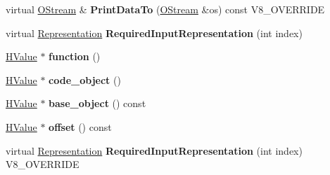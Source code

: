 \begin{DoxyCompactItemize}
\item 
\hypertarget{classv8_1_1internal_1_1_v8___f_i_n_a_l_ac450dad970b14246be761ccf5004924b}{}virtual \hyperlink{classv8_1_1internal_1_1_o_stream}{O\+Stream} \& {\bfseries Print\+Data\+To} (\hyperlink{classv8_1_1internal_1_1_o_stream}{O\+Stream} \&os) const V8\+\_\+\+O\+V\+E\+R\+R\+I\+D\+E\label{classv8_1_1internal_1_1_v8___f_i_n_a_l_ac450dad970b14246be761ccf5004924b}

\item 
\hypertarget{classv8_1_1internal_1_1_v8___f_i_n_a_l_a9c3e2a944e903467b6f0c68ec0ad8827}{}virtual \hyperlink{classv8_1_1internal_1_1_representation}{Representation} {\bfseries Required\+Input\+Representation} (int index)\label{classv8_1_1internal_1_1_v8___f_i_n_a_l_a9c3e2a944e903467b6f0c68ec0ad8827}

\item 
\hypertarget{classv8_1_1internal_1_1_v8___f_i_n_a_l_aafa16c84ec5aa3ee7b4f08e670d6a69f}{}\hyperlink{classv8_1_1internal_1_1_h_value}{H\+Value} $\ast$ {\bfseries function} ()\label{classv8_1_1internal_1_1_v8___f_i_n_a_l_aafa16c84ec5aa3ee7b4f08e670d6a69f}

\item 
\hypertarget{classv8_1_1internal_1_1_v8___f_i_n_a_l_a7f1aa04702e5f3df0a2369fd4f648a9f}{}\hyperlink{classv8_1_1internal_1_1_h_value}{H\+Value} $\ast$ {\bfseries code\+\_\+object} ()\label{classv8_1_1internal_1_1_v8___f_i_n_a_l_a7f1aa04702e5f3df0a2369fd4f648a9f}

\item 
\hypertarget{classv8_1_1internal_1_1_v8___f_i_n_a_l_a3124eeefccd0e3091ad3801b5ba15b67}{}\hyperlink{classv8_1_1internal_1_1_h_value}{H\+Value} $\ast$ {\bfseries base\+\_\+object} () const \label{classv8_1_1internal_1_1_v8___f_i_n_a_l_a3124eeefccd0e3091ad3801b5ba15b67}

\item 
\hypertarget{classv8_1_1internal_1_1_v8___f_i_n_a_l_aa35c06339e01a467a6424f04dba9e533}{}\hyperlink{classv8_1_1internal_1_1_h_value}{H\+Value} $\ast$ {\bfseries offset} () const \label{classv8_1_1internal_1_1_v8___f_i_n_a_l_aa35c06339e01a467a6424f04dba9e533}

\item 
\hypertarget{classv8_1_1internal_1_1_v8___f_i_n_a_l_a6c6d1f37f40b113d8f4062f1ffff7215}{}virtual \hyperlink{classv8_1_1internal_1_1_representation}{Representation} {\bfseries Required\+Input\+Representation} (int index) V8\+\_\+\+O\+V\+E\+R\+R\+I\+D\+E\label{classv8_1_1internal_1_1_v8___f_i_n_a_l_a6c6d1f37f40b113d8f4062f1ffff7215}


\end{DoxyCompactItemize}
